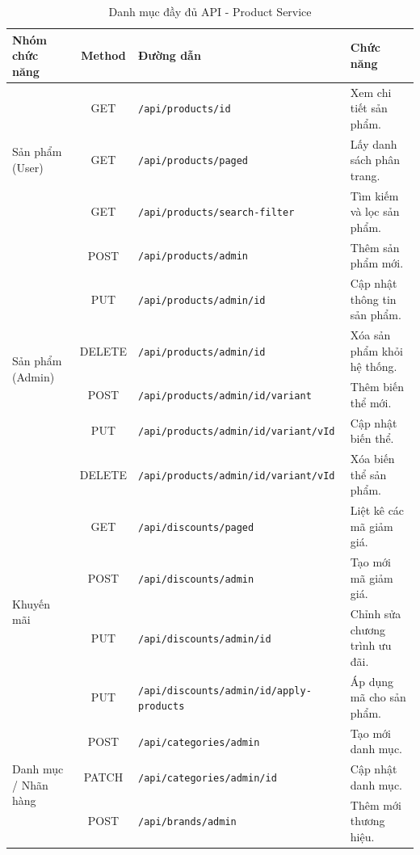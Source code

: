 \begin{table}[H]
\centering
\caption{Danh mục đầy đủ API - Product Service}
\label{tab:full_product_api_appendix}
\begin{tabular}{|l|c|l|l|}
\hline
\textbf{Nhóm chức năng} & \textbf{Method} & \textbf{Đường dẫn} & \textbf{Chức năng} \\ \hline
\multirow{3}{*}{Sản phẩm (User)} & GET & \texttt{/api/products/{id}} & Xem chi tiết sản phẩm. \\ \cline{2-4}
& GET & \texttt{/api/products/paged} & Lấy danh sách phân trang. \\ \cline{2-4}
& GET & \texttt{/api/products/search-filter} & Tìm kiếm và lọc sản phẩm. \\ \hline
\multirow{6}{*}{Sản phẩm (Admin)} & POST & \texttt{/api/products/admin} & Thêm sản phẩm mới. \\ \cline{2-4}
& PUT & \texttt{/api/products/admin/{id}} & Cập nhật thông tin sản phẩm. \\ \cline{2-4}
& DELETE & \texttt{/api/products/admin/{id}} & Xóa sản phẩm khỏi hệ thống. \\ \cline{2-4}
& POST & \texttt{/api/products/admin/{id}/variant} & Thêm biến thể mới. \\ \cline{2-4}
& PUT & \texttt{/api/products/admin/{id}/variant/{vId}} & Cập nhật biến thể. \\ \cline{2-4}
& DELETE & \texttt{/api/products/admin/{id}/variant/{vId}} & Xóa biến thể sản phẩm. \\ \hline
\multirow{4}{*}{Khuyến mãi} & GET & \texttt{/api/discounts/paged} & Liệt kê các mã giảm giá. \\ \cline{2-4}
& POST & \texttt{/api/discounts/admin} & Tạo mới mã giảm giá. \\ \cline{2-4}
& PUT & \texttt{/api/discounts/admin/{id}} & Chỉnh sửa chương trình ưu đãi. \\ \cline{2-4}
& PUT & \texttt{/api/discounts/admin/{id}/apply-products} & Áp dụng mã cho sản phẩm. \\ \hline
\multirow{3}{*}{Danh mục / Nhãn hàng} & POST & \texttt{/api/categories/admin} & Tạo mới danh mục. \\ \cline{2-4}
& PATCH & \texttt{/api/categories/admin/{id}} & Cập nhật danh mục. \\ \cline{2-4}
& POST & \texttt{/api/brands/admin} & Thêm mới thương hiệu. \\ \hline
\end{tabular}
\end{table}

